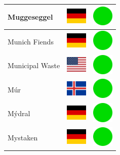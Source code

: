 \documentclass[12pt, a4paper, twoside]{report}
\begin{document}
\begin{center}
\begin{longtable}{|p{5cm}|p{2cm}|p{2cm}|}
 Muggeseggel                                                & \includegraphics[width=1cm]{../img/flags/de} &   \includegraphics[width=1cm]{../likes/y} \\ \hline
 Munich Fiends                                              & \includegraphics[width=1cm]{../img/flags/de} &   \includegraphics[width=1cm]{../likes/y} \\ \hline
 Municipal Waste                                            & \includegraphics[width=1cm]{../img/flags/us} &   \includegraphics[width=1cm]{../likes/y} \\ \hline
 Múr                                                        & \includegraphics[width=1cm]{../img/flags/is} &   \includegraphics[width=1cm]{../likes/y} \\ \hline
 Mýdral                                                     & \includegraphics[width=1cm]{../img/flags/de} &   \includegraphics[width=1cm]{../likes/y} \\ \hline
 Mystaken                                                   & \includegraphics[width=1cm]{../img/flags/de} &   \includegraphics[width=1cm]{../likes/y} \\ \hline

\end{longtable}
\end{center}
\end{document}
